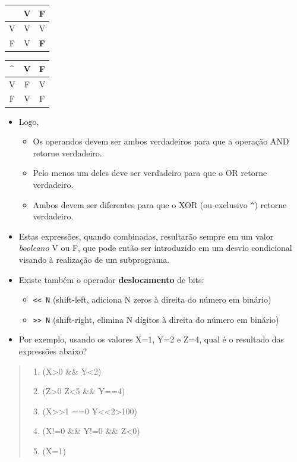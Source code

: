 \documentclass[12pt,a4paper]{article}
\providecommand{\tightlist}{%
      \setlength{\itemsep}{0pt}\setlength{\parskip}{0pt}}
\begin{document}
    \begin{longtable}[]{@{}ccc@{}}
\toprule
\textbar{}\textbar{} & V & F\tabularnewline
\midrule
\endhead
V & V & V\tabularnewline
F & V & \textbf{F}\tabularnewline
\bottomrule
\end{longtable}

    \begin{longtable}[]{@{}ccc@{}}
\toprule
\^{} & V & F\tabularnewline
\midrule
\endhead
V & F & V\tabularnewline
F & V & F\tabularnewline
\bottomrule
\end{longtable}

    \begin{itemize}
\tightlist
\item
  Logo,

  \begin{itemize}
  \tightlist
  \item
    Os operandos devem ser ambos verdadeiros para que a operação AND
    retorne verdadeiro.
  \item
    Pelo menos um deles deve ser verdadeiro para que o OR retorne
    verdadeiro.
  \item
    Ambos devem ser diferentes para que o XOR (ou exclusivo
    \texttt{\^{}}) retorne verdadeiro.
  \end{itemize}
\end{itemize}

    \begin{itemize}
\item
  Estas expressões, quando combinadas, resultarão sempre em um valor
  \emph{booleano} V ou F, que pode então ser introduzido em um desvio
  condicional visando à realização de um subprograma.
\item
  Existe também o operador \textbf{deslocamento} de bits:

  \begin{itemize}
  \tightlist
  \item
    \texttt{\textless{}\textless{}\ N} (shift-left, adiciona N zeros à
    direita do número em binário)
  \item
    \texttt{\textgreater{}\textgreater{}\ N} (shift-right, elimina N
    dígitos à direita do número em binário)
  \end{itemize}
\item
  Por exemplo, usando os valores X=1, Y=2 e Z=4, qual é o resultado das
  expressões abaixo?
\end{itemize}

\begin{quote}
\begin{enumerate}
\def\labelenumi{\arabic{enumi}.}
\tightlist
\item
  (X\textgreater{}0 \&\& Y\textless{}2)
\item
  (Z\textgreater{}0 \textbar{}\textbar{} Z\textless{}5 \&\& Y==4)
\item
  (X\textgreater{}\textgreater{}1 ==0 \textbar{}\textbar{}
  Y\textless{}\textless{}2\textgreater{}100)
\item
  (X!=0 \&\& Y!=0 \&\& Z\textless{}0)
\item
  (X=1)
\end{enumerate}
\end{quote}
\end{document}
